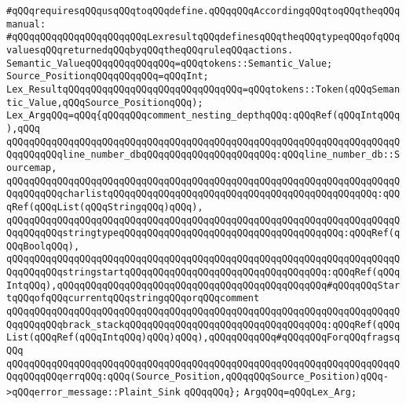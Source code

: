 \verb|#qQQqrequiresqQQqusqQQqtoqQQqdefine.qQQqqQQqAccordingqQQqtoqQQqtheqQQqmanual:|\newline
\verb|#qQQqqQQqqQQqqQQqqQQqqQQqLexresultqQQqdefinesqQQqtheqQQqtypeqQQqofqQQqvaluesqQQqreturnedqQQqbyqQQqtheqQQqruleqQQqactions.|\newline
\newline
\verb|Semantic_ValueqQQqqQQqqQQqqQQq=qQQqtokens::Semantic_Value;|\newline
\verb|Source_PositionqQQqqQQqqQQq=qQQqInt;|\newline
\verb|Lex_ResultqQQqqQQqqQQqqQQqqQQqqQQqqQQqqQQq=qQQqtokens::Token(qQQqSemantic_Value,qQQqSource_PositionqQQq);|\newline
\newline
\verb|Lex_ArgqQQq=qQQq{qQQqqQQqcomment_nesting_depthqQQq:qQQqRef(qQQqIntqQQq),qQQq|\newline
\verb|qQQqqQQqqQQqqQQqqQQqqQQqqQQqqQQqqQQqqQQqqQQqqQQqqQQqqQQqqQQqqQQqqQQqqQQqqQQqqQQqline_number_dbqQQqqQQqqQQqqQQqqQQqqQQq:qQQqline_number_db::Sourcemap,|\newline
\verb|qQQqqQQqqQQqqQQqqQQqqQQqqQQqqQQqqQQqqQQqqQQqqQQqqQQqqQQqqQQqqQQqqQQqqQQqqQQqqQQqcharlistqQQqqQQqqQQqqQQqqQQqqQQqqQQqqQQqqQQqqQQqqQQqqQQq:qQQqRef(qQQqList(qQQqStringqQQq)qQQq),|\newline
\newline
\verb|qQQqqQQqqQQqqQQqqQQqqQQqqQQqqQQqqQQqqQQqqQQqqQQqqQQqqQQqqQQqqQQqqQQqqQQqqQQqqQQqstringtypeqQQqqQQqqQQqqQQqqQQqqQQqqQQqqQQqqQQqqQQq:qQQqRef(qQQqBoolqQQq),|\newline
\verb|qQQqqQQqqQQqqQQqqQQqqQQqqQQqqQQqqQQqqQQqqQQqqQQqqQQqqQQqqQQqqQQqqQQqqQQqqQQqqQQqstringstartqQQqqQQqqQQqqQQqqQQqqQQqqQQqqQQqqQQq:qQQqRef(qQQqIntqQQq),qQQqqQQqqQQqqQQqqQQqqQQqqQQqqQQqqQQqqQQqqQQqqQQq#qQQqqQQqStartqQQqofqQQqcurrentqQQqstringqQQqorqQQqcomment|\newline
\verb|qQQqqQQqqQQqqQQqqQQqqQQqqQQqqQQqqQQqqQQqqQQqqQQqqQQqqQQqqQQqqQQqqQQqqQQqqQQqqQQqbrack_stackqQQqqQQqqQQqqQQqqQQqqQQqqQQqqQQqqQQq:qQQqRef(qQQqList(qQQqRef(qQQqIntqQQq)qQQq)qQQq),qQQqqQQqqQQq#qQQqqQQqForqQQqfragsqQQq|\newline
\newline
\verb|qQQqqQQqqQQqqQQqqQQqqQQqqQQqqQQqqQQqqQQqqQQqqQQqqQQqqQQqqQQqqQQqqQQqqQQqqQQqqQQqerrqQQq:qQQq(Source_Position,qQQqqQQqSource_Position)qQQq->qQQqerror_message::Plaint_Sink|\newline
\verb|qQQqqQQq};|\newline
\newline
\verb|ArgqQQq=qQQqLex_Arg;|\newline
